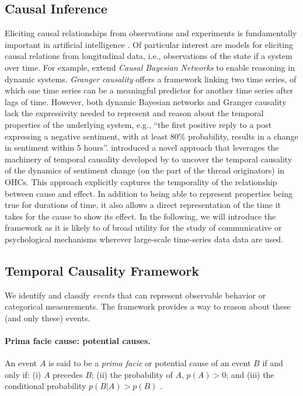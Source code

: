 \documentclass[man,biblatex,floatsintext]{apa6}
\begin{document}
\subsection{Causal Inference}
Eliciting causal relationships from observations and experiments is fundamentally important in artificial intelligence \parencite{Pearl2000Causality,Spirtes2000,pearl2016causal}. Of particular interest are models for eliciting causal relations from longitudinal data, i.e., observations of the state if a system over time. For example, \textcite{dagum1992dynamic,ghahramani1998learning} extend \emph{Causal Bayesian Networks} to enable reasoning in dynamic systems. \emph{Granger causality} \parencite{granger1969investigating} offers a framework linking two time series, of which one time series can be a meaningful predictor for another time series after lags of time. However, both dynamic Bayesian networks and Granger causality lack the expressivity needed to represent and reason about the temporal properties of the underlying system, e.g., ``the first positive reply to a post expressing a negative sentiment, with at least 80\% probability, results in a change in sentiment within 5 hours''. \textcite{bui2016temporal} introduced a novel approach that leverages the machinery of temporal causality developed by \textcite{kleinberg_uai09} to uncover the temporal causality of the dynamics of sentiment change (on the part of the thread originators) in OHCs. This approach explicitly captures the temporality of the relationship between cause and effect. In addition to being able to represent properties being true for durations of time, it also allows a direct representation of the time it takes for the cause to show its effect. In the following, we will introduce the framework as it is likely to of broad utility for the study of communicative or psychological mechanisms wherever large-scale time-series data data are used.


\subsection{Temporal Causality Framework}
We identify and classify \emph{events} that can represent observable behavior or categorical measurements.  The framework provides a way to reason about these (and only these) events.

\paragraph{Prima facie cause: potential causes.}
An event \emph{$A$} is said to be a \emph{prima facie} or potential cause of an event \emph{$B$} if and only if: (i) \emph{$A$} precedes \textit{$B$}; (ii) the probability of $A$, $p(A)>0$; and (iii) the conditional probability $p(B|A)>p(B)$ \parencite{suppes1970probabilistic}.
\end{document}
